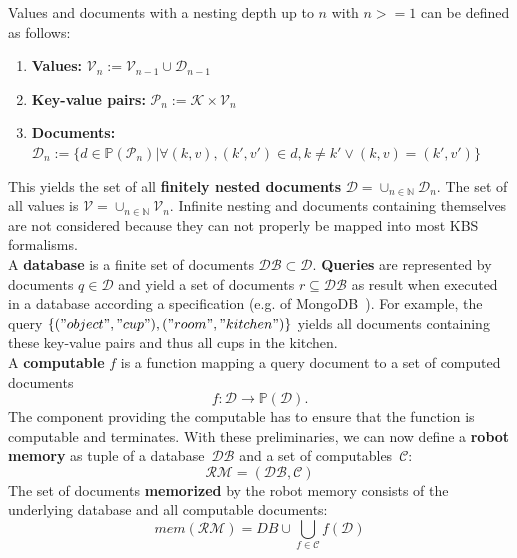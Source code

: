 \documentclass[a4paper,11pt]{article}
\begin{document}
Values and documents with a nesting depth up to $n$ with $n>=1$ can be
defined as follows:
\begin{enumerate}
\item  \textbf{Values:} $\mathcal{V}_n := \mathcal{V}_{n-1} \cup \mathcal{D}_{n-1}$
\item \textbf{Key-value pairs:} $\mathcal{P}_n:=\mathcal{K}\times\mathcal{V}_n$
\item \textbf{Documents:}
  $\mathcal{D}_n:=\{
  d\in\mathbb{P}(\mathcal{P}_n)|
  \forall (k,v),(k',v')\in d , k\neq k' \vee (k,v)=(k',v')
  \}$
\end{enumerate}
This yields the set of all \textbf{finitely nested documents}
$\mathcal{D}=\cup_{n\in\mathbb{N}}\mathcal{D}_n$.
The set of all values is $\mathcal{V}=\cup_{n\in\mathbb{N}}\mathcal{V}_n$.
  Infinite nesting and
documents containing themselves are not considered because they can
not properly be mapped into most KBS formalisms.
\\
A \textbf{database} is a finite set of documents $\mathcal{DB} \subset \mathcal{D}$.
\textbf{Queries} are represented by documents $q\in\mathcal{D}$ and yield a set
of documents $r\subseteq\mathcal{DB}$ as result when executed in a database according a
specification (e.g. of MongoDB~\cite{mongodb}). For example, the query
$\{("object","cup"),("room","kitchen")\}$ yields all documents containing these
key-value pairs and thus all cups in the kitchen.
\\
A \textbf{computable} $f$ is a function mapping a query document to a
set of computed documents
$$f: \mathcal{D} \rightarrow \mathbb{P}(\mathcal{D})\text{.}$$
The component providing the computable has to ensure that the function is computable and terminates.
%
With these preliminaries, we can now define a \textbf{robot memory} as tuple
of a database~$\mathcal{DB}$ and a set of computables~$\mathcal{C}$:
$$\mathcal{RM}=(\mathcal{DB},\mathcal{C})$$
%
The set of documents \textbf{memorized} by the robot memory consists
of the underlying database and all computable documents:
$$mem(\mathcal{RM})=DB \cup \bigcup_{f\in\mathcal{C}}f(\mathcal{D})$$
\end{document}
